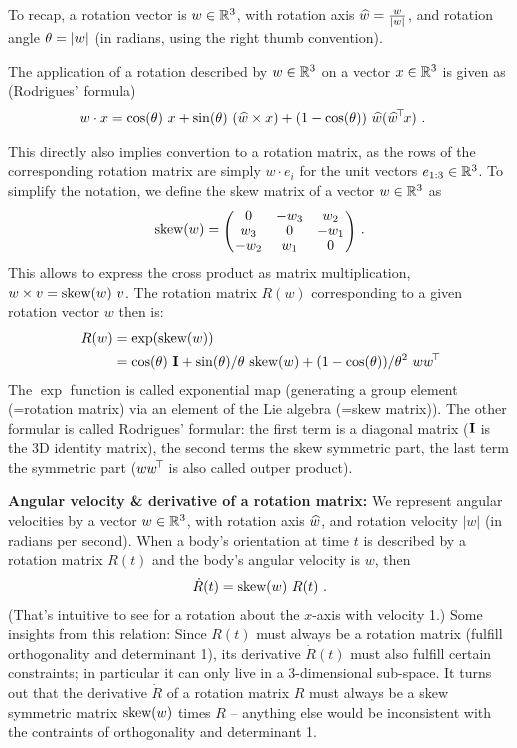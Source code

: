 To recap, a rotation vector is $w\in{\mathbb{R}}^3$, with rotation axis $\widehat w
= \frac{w}{|w|}$, and rotation angle $\theta = |w|$ (in
radians, using the right thumb convention).

The application of a rotation described by $w\in{\mathbb{R}}^3$ on a vector
$x\in{\mathbb{R}}^3$ is given as (Rodrigues' formula)
\begin{align}
w \cdot x
 &= \cos(\theta)~ x
  + \sin(\theta)~ (\widehat w\times x)
  + (1-\cos(\theta))~ \widehat w(\widehat w^{\!\top\!} x) ~.
\end{align}

This directly also implies convertion to a rotation matrix, as the
rows of the corresponding rotation matrix are simply $w \cdot e_i$ for
the unit vectors $e_{1:3}\in{\mathbb{R}}^3$. To simplify the notation, we
define the skew matrix of a vector $w\in{\mathbb{R}}^3$ as
\begin{align}
\skew(w) = \mat{ccc}{0 & -w_3 & w_2 \\ w_3 & 0 & -w_1 \\ -w_2 & w_1 & 0} ~.
\end{align}
This allows to express the cross
product as matrix multiplication, $w \times v = \text{skew}(w)~ v$. The rotation matrix $R(w)$ 
corresponding to a given rotation vector $w$ then is:
\begin{align}\label{eqRodriguez}
R(w)
 &= \exp(\text{skew}(w)) \\
 &= \cos(\theta)~ {\rm\bf I} + \sin(\theta)/\theta~ \text{skew}(w) + (1-\cos(\theta))/\theta^2~ w w^{\!\top\!}
\end{align}
The $\exp$ function is called exponential map (generating a group
element (=rotation matrix) via an element of the Lie algebra (=skew
matrix)). The other formular is called Rodrigues' formular: the first
term is a diagonal matrix (${\rm\bf I}$ is the 3D identity matrix), the second
terms the skew symmetric part, the last term the symmetric part ($w
w^{\!\top\!}$ is also called outper product).


\textbf{Angular velocity \& derivative of a rotation matrix:} We
represent angular velocities by a vector $w\in{\mathbb{R}}^3$, with rotation axis
$\widehat w$, and rotation velocity $|w|$ (in radians per second). When a body's orientation at time
$t$ is described by a rotation matrix $R(t)$ and the body's angular
velocity is $w$, then
\begin{align}\label{eqDotR}
\dot R(t) = \text{skew}(w)~ R(t)~.
\end{align}
(That's intuitive to see for a rotation about the $x$-axis with
velocity 1.) Some insights from this relation: Since $R(t)$ must
always be a rotation matrix (fulfill orthogonality and determinant 1),
its derivative $\dot R(t)$ must also fulfill certain constraints; in
particular it can only live in a 3-dimensional sub-space. It turns out
that the derivative $\dot R$ of a rotation matrix $R$ must always be a
skew symmetric matrix $\text{skew}(w)$ times $R$ -- anything else would be
inconsistent with the contraints of orthogonality and determinant 1.

